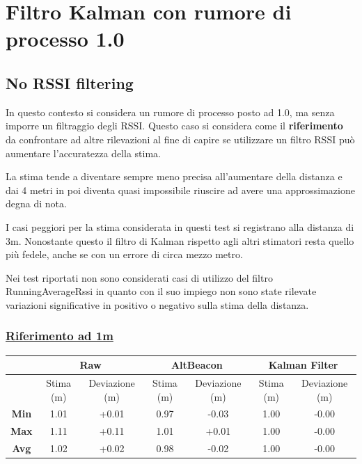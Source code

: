 \section{Filtro Kalman con rumore di processo 1.0}
\subsection{No RSSI filtering}

In questo contesto si considera un rumore di processo posto ad 1.0,  ma senza imporre un filtraggio degli RSSI. Questo caso si considera come il \textbf{riferimento} da confrontare ad altre rilevazioni al fine di capire se utilizzare un filtro RSSI può aumentare l'accuratezza della stima.

La stima tende a diventare sempre meno precisa all'aumentare della distanza e dai 4 metri in poi diventa quasi impossibile riuscire ad avere una approssimazione degna di nota.

I casi peggiori per la stima considerata in questi test si registrano alla distanza di 3m. Nonostante questo il filtro di Kalman rispetto agli altri stimatori resta quello più fedele, anche se con un errore di circa mezzo metro.

Nei test riportati non sono considerati casi di utilizzo del filtro RunningAverageRssi in quanto con il suo impiego non sono state rilevate variazioni significative in positivo o negativo sulla stima della distanza.

\subsubsection{\underline{Riferimento ad 1m}}
\begin{center}
	\begin{tabular}{|c|c|c|c|c|c|c|}
		\hline 
		& \multicolumn{2}{|c|}{\textbf{Raw}} &\multicolumn{2}{|c|}{\textbf{AltBeacon}} &\multicolumn{2}{|c|}{\textbf{Kalman Filter}}\\ 
		\hline 
		& Stima (m) & Deviazione (m) & Stima (m) & Deviazione (m) & Stima (m)& Deviazione (m)\\ 
		\hline 
		\textbf{Min} & 1.01	& +0.01 & 0.97	& -0.03 & 1.00	& -0.00 \\ 
		\hline 
		\textbf{Max} & 1.11	& +0.11 & 1.01	& +0.01 & 1.00	& -0.00	\\ 
		\hline 
		\textbf{Avg} & 1.02	& +0.02 & 0.98 	& -0.02 & 1.00 	& -0.00	\\ 
		\hline 
	\end{tabular}
\end{center}

